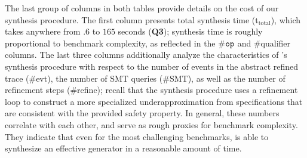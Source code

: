 The last group of columns in both tables provide details on the cost
of our synthesis procedure. The first column presents total synthesis
time (t$_\text{total}$), which takes anywhere from $.6$ to $165$
seconds (\textbf{Q3}); synthesis time is roughly proportional to
benchmark complexity, as reflected in the \#$\boldsymbol{{\tt op}}$ and \#qualifier
columns.  The last three columns additionally analyze the
characteristics of \name{}'s synthesis procedure with respect to the
number of events in the abstract refined trace (\#evt), the number of
SMT queries (\#SMT), as well as the number of refinement steps
(\#refine); recall that the synthesis procedure uses a refinement loop
to construct a more specialized underapproximation from \tyName{}
specifications that are consistent with the provided safety property.
In general, these numbers correlate with each other, and serve as
rough proxies for benchmark complexity.  They indicate that even for
the most challenging benchmarks, \name{} is able to synthesize an
effective generator in a reasonable amount of time.
